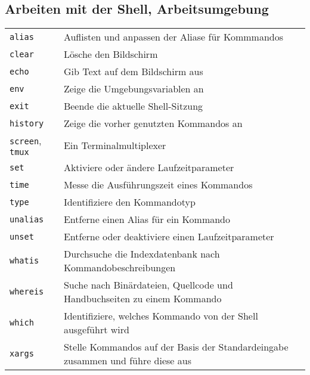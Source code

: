\documentclass[10pt,a4paper]{article}
\begin{document}
\begin{multicols}{2}
\section{Arbeiten mit der Shell, Arbeitsumgebung}
\begin{tabular}{ p{2.5cm} p{8.5cm} }
  \hline
  \texttt{alias} & Auflisten und anpassen der Aliase für Kommmandos \\
  \rowcolor{Gray}
  \texttt{clear} & Lösche den Bildschirm \\
  \texttt{echo} & Gib Text auf dem Bildschirm aus \\
  \rowcolor{Gray}
  \texttt{env} & Zeige die Umgebungsvariablen an \\
  \texttt{exit} & Beende die aktuelle Shell-Sitzung \\
  \rowcolor{Gray}
  \texttt{history} & Zeige die vorher genutzten Kommandos an \\
  \texttt{screen}, \texttt{tmux} & Ein Terminalmultiplexer \\
  \rowcolor{Gray}
  \texttt{set} & Aktiviere oder ändere Laufzeitparameter \\
  \texttt{time} & Messe die Ausführungszeit eines Kommandos \\
  \rowcolor{Gray}
  \texttt{type} & Identifiziere den Kommandotyp \\
  \texttt{unalias} & Entferne einen Alias für ein Kommando \\
  \rowcolor{Gray}
  \texttt{unset} & Entferne oder deaktiviere einen Laufzeitparameter \\
  \texttt{whatis} & Durchsuche die Indexdatenbank nach Kommando\-beschreibungen \\
  \rowcolor{Gray}
  \texttt{whereis} & Suche nach Binärdateien, Quellcode und Handbuchseiten zu einem Kommando \\
  \texttt{which} & Identifiziere, welches Kommando von der Shell ausgeführt wird\\
  \rowcolor{Gray}
  \texttt{xargs} & Stelle Kommandos auf der Basis der Standardeingabe zusammen und führe diese aus \\
  \hline
\end{tabular}



\end{multicols}
\end{document}
